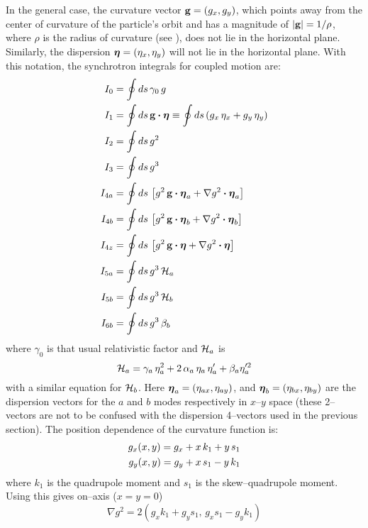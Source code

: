 In the general case, the curvature vector ${\bf g} = (g_x, g_y)$, which points away from the center of
curvature of the particle's orbit and has a magnitude of $|{\bf g}| = 1/\rho$, where $\rho$ is the
radius of curvature (see ), does not lie in the horizontal plane. Similarly, the
dispersion $\boldsymbol{\eta} = (\eta_x, \eta_y)$ will not lie in the horizontal plane. With this notation,
the synchrotron integrals for coupled motion are:
  \begingroup
  \allowdisplaybreaks
  \begin{align}
    I_0 &= \oint ds \, \gamma_0 \, g \\
    I_1 &= \oint ds \, {\bf g} \mathbin{\boldsymbol{\cdot}} \boldsymbol{\eta} 
         \equiv \oint ds \, (g_x \, \eta_x + g_y \, \eta_y) \\
    I_2 &= \oint ds \, g^2 \\
    I_3 &= \oint ds \, g^3 \\
    I_{4a} &= \oint ds \, \left[ g^2 \, {\bf g} \mathbin{\boldsymbol{\cdot}} \boldsymbol{\eta}_a + 
         \nabla g^2 \mathbin{\boldsymbol{\cdot}} \boldsymbol{\eta}_a \right] \\
    I_{4b} &= \oint ds \, \left[ g^2 \, {\bf g} \mathbin{\boldsymbol{\cdot}} \boldsymbol{\eta}_b + 
         \nabla g^2 \mathbin{\boldsymbol{\cdot}} \boldsymbol{\eta}_b \right] \\
    I_{4z} &= \oint ds \, \left[ g^2 \, {\bf g} \mathbin{\boldsymbol{\cdot}} \boldsymbol{\eta} + 
         \nabla g^2 \mathbin{\boldsymbol{\cdot}} \boldsymbol{\eta} \right] \\
    I_{5a} &= \oint ds \, g^3 \, {\cal H}_a \\
    I_{5b} &= \oint ds \, g^3 \, {\cal H}_b \\
    I_{6b} &= \oint ds \, g^3 \, \beta_b
  \end{align}
  \endgroup
where $\gamma_0$ is that usual relativistic factor and ${\cal H}_a$ is 
  \begin{equation}
    {\cal H}_a = \gamma_a \, \eta_a^2 + 2 \, \alpha_a \, \eta_a \, \eta_a' + 
      \beta_a \eta_a'^2 
  \end{equation}
with a similar equation for ${\cal H}_b$. Here $\boldsymbol{\eta}_a =
(\eta_{ax}, \eta_{ay})$, and $\boldsymbol{\eta}_b = (\eta_{bx}, \eta_{by})$
are the dispersion vectors for the $a$ and $b$ modes respectively in
$x$--$y$ space (these 2--vectors are not to be confused with the
dispersion 4--vectors used in the previous section). The position
dependence of the curvature function is:
  \begin{align}
    g_x(x,y) = g_{x} + x \, k_1 + y \, s_1 \nonumber \\
    g_y(x,y) = g_{y} + x \, s_1 - y \, k_1 
  \end{align}
where $k_1$ is the quadrupole moment and $s_1$ is the skew--quadrupole moment.
Using this gives on--axis ($x = y = 0$)
  \begin{equation}
    \nabla g^2 = 2 \left( g_x k_1 + g_y s_1, \, g_x s_1 - g_y k_1 \right)
    \label{g2gkg}
  \end{equation}

